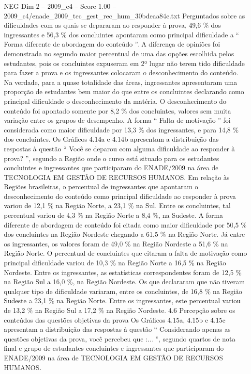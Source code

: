 \begin{textsample}{NEG Dim 2 – 2009\_c4 – Score 1.00 – 2009\_c4/enade\_2009\_tec\_gest\_rec\_hum\_30bdeaa84c.txt}
Perguntados sobre as dificuldades com as quais se depararam ao responder à prova, 49,6 \% dos ingressantes e 56,3 \% dos concluintes apontaram como principal dificuldade a “ Forma diferente de abordagem do conteúdo ”.
A diferença de opiniões foi demonstrada no segundo maior percentual de uma das opções escolhida pelos estudantes, pois os concluintes expuseram em 2º lugar não terem tido dificuldade para fazer a prova e os ingressantes colocaram o desconhecimento do conteúdo.
Na verdade, para a quase totalidade das áreas, ingressantes apresentaram uma proporção de estudantes bem maior do que entre os concluintes declarando como principal dificuldade o desconhecimento da matéria.
O desconhecimento do conteúdo foi apontado somente por 8,2 \% dos concluintes, valores sem muita variação entre os grupos de desempenho.
A forma “ Falta de motivação ” foi considerada como maior dificuldade por 13,3 \% dos ingressantes, e para 14,8 \% dos concluintes.
Os Gráficos 4.14a e 4.14b apresentam a distribuição das respostas à questão “ Você se deparou com alguma dificuldade ao responder à prova? ”, segundo a Região onde o curso está situado para os estudantes concluintes e ingressantes que participaram do ENADE/2009 na área de TECNOLOGIA EM GESTÃO DE RECURSOS HUMANOS.
Em relação às Regiões brasileiras, o percentual de ingressantes que apontaram o desconhecimento do conteúdo como principal dificuldade ao responder à prova variou de 12,1 \% na Região Norte, a 23,1 \% na Sul.
Entre os concluintes, tal percentual variou de 4,3 \% na Região Norte a 8,4 \%, na Sudeste.
A forma diferente de abordagem de conteúdo foi citada como maior dificuldade por 50,5 \% dos concluintes na Região Nordeste chegando a 61,5 \% na Região Norte.
Já entre os ingressantes, os valores foram de 49,0 \% na Região Nordeste a 51,6 \% na Região Norte.
O percentual de concluintes que citaram a falta de motivação como principal dificuldade variou de 10,3 \% na Região Norte a 16,5 \% na Região Nordeste.
Entre os ingressantes, as estatísticas correspondentes foram de 12,5 \% na Região Sul a 16,0 \%, na Região Nordeste.
Os que declararam que não tiveram qualquer tipo de dificuldade variaram, entre os concluintes, de 16,8 \% na Região Sudeste a 23,1 \% na Região Norte.
Entre os ingressantes, este percentual variou de 13,2 \% na Região Sul a 17,2 \% na Região Nordeste. 4.6 Percepção sobre os conteúdos das questões objetivas da prova Os Gráficos 4.15a, 4.15b e 4.15c apresentam a distribuição das respostas à questão “ Considerando apenas as questões objetivas da prova, você percebeu que :... ”, segundo quartos de nota final e grupo de estudantes concluintes e ingressantes que participaram do ENADE/2009 na área de TECNOLOGIA EM GESTÃO DE RECURSOS HUMANOS.

\end{textsample}

